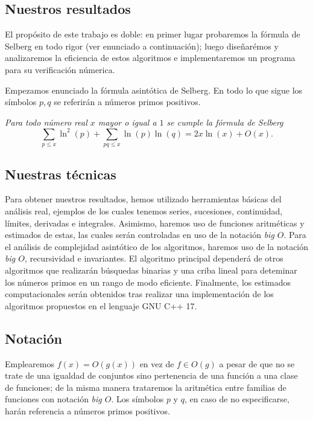 \subsection{Nuestros resultados}
El prop\'osito de este trabajo es doble: 
en primer lugar probaremos la f\'ormula de Selberg en todo rigor (ver enunciado a continuaci\'on); 
luego diseñar\'emos y analizaremos la eficiencia de estos algoritmos e
implementaremos un programa para su verificaci\'on n\'umerica.
\bigskip

Empezamos enunciado la f\'ormula asint\'otica de Selberg. 
En todo lo que sigue los s\'imbolos $p,q$ se referir\'an a n\'umeros primos positivos.
\bigskip

{\it Para todo n\'umero real $x$ mayor o igual a $1$ se cumple la f\'ormula de Selberg}
\[
\sum_{p \leq x} \ln^2(p) + \sum_{pq \leq x} \ln(p) \ln(q) = 2x\ln(x) + O(x).
\]

\subsection{Nuestras t\'ecnicas}
Para obtener nuestros resultados, hemos utilizado herramientas b\'asicas del
an\'alisis real, ejemplos de los cuales tenemos series, sucesiones, continuidad,
l\'imites, derivadas e integrales. 
Asimismo, haremos uso de funciones aritm\'eticas
y estimados de estas, las cuales ser\'an controladas en uso de la notaci\'on {\it big $O$}.
Para el an\'alisis de complejidad asint\'otico de los algoritmos,
haremos uso de la notaci\'on {\it big $O$}, recursividad e invariantes.
El algoritmo principal depender\'a de otros algoritmos que realizar\'an
b\'usquedas binarias y una criba lineal para deteminar los n\'umeros primos en un rango de modo eficiente.
Finalmente, los estimados computacionales ser\'an obtenidos tras realizar una
implementaci\'on de los algoritmos propuestos en el lenguaje GNU C++ 17.

\subsection{Notaci\'on}
Emplearemos $f(x) = O(g(x))$ en vez de $f \in O(g)$
a pesar de que no se trate de una igualdad de conjuntos sino
pertenencia de una funci\'on a una clase de funciones; 
de la misma manera
trataremos la aritm\'etica entre familias de funciones con notaci\'on {\it big $O$}.
Los s\'imbolos $p$ y $q$, en caso de no especificarse,
har\'an referencia a n\'umeros primos positivos.


